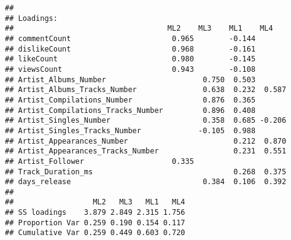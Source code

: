 \documentclass[
]{article}
\newenvironment{Shaded}{\begin{snugshade}}{\end{snugshade}}
\newcommand{\CommentTok}[1]{\textcolor[rgb]{0.56,0.35,0.01}{\textit{#1}}}
\newcommand{\DataTypeTok}[1]{\textcolor[rgb]{0.13,0.29,0.53}{#1}}
\newcommand{\DecValTok}[1]{\textcolor[rgb]{0.00,0.00,0.81}{#1}}
\newcommand{\KeywordTok}[1]{\textcolor[rgb]{0.13,0.29,0.53}{\textbf{#1}}}
\newcommand{\NormalTok}[1]{#1}
\newcommand{\OperatorTok}[1]{\textcolor[rgb]{0.81,0.36,0.00}{\textbf{#1}}}
\newcommand{\StringTok}[1]{\textcolor[rgb]{0.31,0.60,0.02}{#1}}
\begin{document}
\begin{Shaded}
\end{Shaded}

\begin{verbatim}
## 
## Loadings:
##                                   ML2    ML3    ML1    ML4   
## commentCount                       0.965        -0.144       
## dislikeCount                       0.968        -0.161       
## likeCount                          0.980        -0.145       
## viewsCount                         0.943        -0.108       
## Artist_Albums_Number                      0.750  0.503       
## Artist_Albums_Tracks_Number               0.638  0.232  0.587
## Artist_Compilations_Number                0.876  0.365       
## Artist_Compilations_Tracks_Number         0.896  0.408       
## Artist_Singles_Number                     0.358  0.685 -0.206
## Artist_Singles_Tracks_Number             -0.105  0.988       
## Artist_Appearances_Number                        0.212  0.870
## Artist_Appearances_Tracks_Number                 0.231  0.551
## Artist_Follower                    0.335                     
## Track_Duration_ms                                0.268  0.375
## days_release                              0.384  0.106  0.392
## 
##                  ML2   ML3   ML1   ML4
## SS loadings    3.879 2.849 2.315 1.756
## Proportion Var 0.259 0.190 0.154 0.117
## Cumulative Var 0.259 0.449 0.603 0.720
\end{verbatim}
\end{document}
